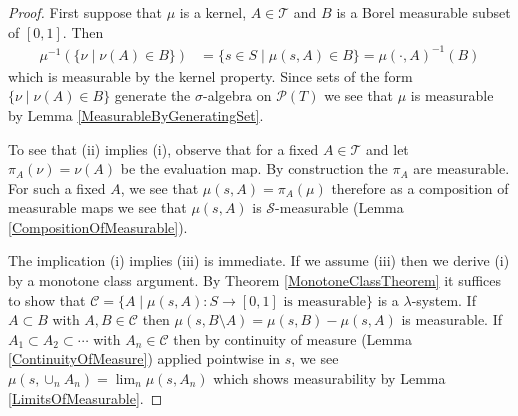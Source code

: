 \begin{proof}
First suppose that $\mu$ is a kernel, $A \in \mathcal{T}$
and $B$ is a Borel
measurable subset of $[0,1]$.  Then 
\begin{align*}
\mu^{-1}(\lbrace \nu \mid \nu(A)
\in B \rbrace) &= \lbrace s \in S \mid \mu(s,A) \in B \rbrace =
\mu(\cdot, A)^{-1}(B)
\end{align*}
which is measurable by the kernel property.  Since sets of the form $\lbrace \nu \mid \nu(A)
\in B \rbrace$ generate the $\sigma$-algebra on $\mathcal{P}(T)$ we
see that $\mu$ is measurable by Lemma \ref{MeasurableByGeneratingSet}.

To see that (ii) implies (i), observe that for a fixed $A \in
\mathcal{T}$ and let $\pi_A(\nu) = \nu(A)$ be the evaluation map.  By
construction the $\pi_A$ are measurable.  For such a fixed $A$, we see
that $\mu(s, A) = \pi_A(\mu)$ therefore as a composition of measurable
maps we see that $\mu(s,A)$ is $\mathcal{S}$-measurable (Lemma
\ref{CompositionOfMeasurable}).

The implication (i) implies (iii) is immediate.  If we assume (iii)
then we derive (i) by a monotone class argument.  By Theorem
\ref{MonotoneClassTheorem} it suffices to show that $\mathcal{C} =
\lbrace A \mid \mu(s, A) : S \to [0,1] \text { is measurable}\rbrace$
is a $\lambda$-system.  If $A \subset B$ with $A,B \in \mathcal{C}$
then $\mu(s, B \setminus A) = \mu(s, B) - \mu(s,A)$ is measurable.  If
$A_1 \subset A_2 \subset \cdots$ with $A_n \in \mathcal{C}$ then by
continuity of measure (Lemma \ref{ContinuityOfMeasure}) applied
pointwise in $s$, we see $\mu(s, \cup_n A_n) = \lim_n \mu(s, A_n)$
which shows measurability by Lemma \ref{LimitsOfMeasurable}.
\end{proof}

